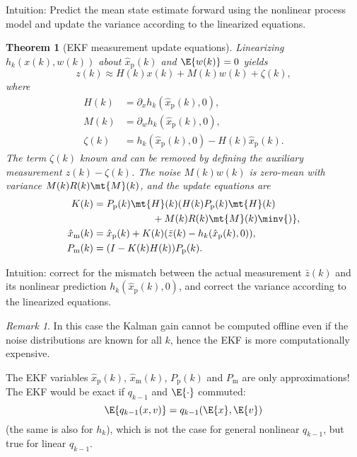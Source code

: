 \documentclass[]{hsrzf}
\theoremstyle{plain}
\newtheorem{thm}{Theorem}[section]
\theoremstyle{definition}
\theoremstyle{remark}
\newtheorem*{remark}{Remark}
\begin{document}
Intuition: Predict the mean state estimate forward using the nonlinear process
model and update the variance according to the linearized equations.

\begin{thm}[EKF measurement update equations]
  Linearizing $h_k(x(k), w(k))$ about $\hat{x}_\mathrm{p}(k)$ and $\E{w(k)} =
  0$ yields
  \[
    z(k) \approx H(k) x(k) + M(k) w(k) + \zeta(k),
  \]
  where
  \begin{align*}
    H(k) &= \partial_x h_{k}(\hat{x}_\mathrm{p}(k), 0), \\
    M(k) &= \partial_w h_{k}(\hat{x}_\mathrm{p}(k), 0), \\
    \zeta(k) &= h_k(\hat{x}_\mathrm{p}(k), 0) - H(k) \hat{x}_\mathrm{p}(k).
  \end{align*}
  The term $\zeta(k)$ known and can be removed by defining the auxiliary
  measurement $z(k) - \zeta(k)$. The noise $M(k)w(k)$ is zero-mean with
  variance $M(k)R(k)\mt{M}(k)$, and the update equations are
  \begin{align*}
    K(k) &= P_\mathrm{p}(k) \mt{H}(k) (
        H(k) P_\mathrm{p}(k) \mt{H}(k) \\
        &\qquad\qquad\qquad + M(k) R(k) \mt{M}(k) \minv{)}, \\
    \hat{x}_\mathrm{m}(k) &= \hat{x}_\mathrm{p}(k) + K(k) (
        \bar{z}(k) - h_k(\hat{x}_\mathrm{p}(k), 0)), \\
    P_\mathrm{m}(k) &= (I - K(k)H(k)) P_\mathrm{p}(k).
  \end{align*}
\end{thm}

Intuition: correct for the mismatch between the actual measurement
$\bar{z}(k)$ and its nonlinear prediction $h_k(\hat{x}_\mathrm{p}(k), 0)$,
and correct the variance according to the linearized equations.

\begin{remark}
  In this case the Kalman gain cannot be computed offline even if the noise
  distributions are known for all $k$, hence the EKF is more computationally
  expensive.
\end{remark}

The EKF variables $\hat{x}_\mathrm{p}(k)$, $\hat{x}_\mathrm{m}(k)$,
$P_\mathrm{p}(k)$ and $P_\mathrm{m}$ are only approximations! The EKF would be
exact if $q_{k-1}$ and $\E{\cdot}$ commuted:
\[
  \E{q_{k-1}(x, v)} = q_{k-1}(\E{x}, \E{v})
\]
(the same is also for $h_k$), which is not the case for general nonlinear
$q_{k-1}$, but true for linear $q_{k-1}$.
\end{document}
